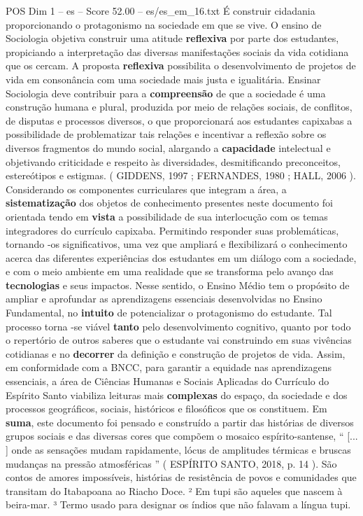 \begin{textsample}{POS Dim 1 – es – Score 52.00 – es/es\_em\_16.txt}
É construir cidadania proporcionando o protagonismo na sociedade em que se vive.
O ensino de Sociologia objetiva construir uma atitude \textbf{reflexiva} por parte dos estudantes, propiciando a interpretação das diversas manifestações sociais da vida cotidiana que os cercam.
A proposta \textbf{reflexiva} possibilita o desenvolvimento de projetos de vida em consonância com uma sociedade mais justa e igualitária.
Ensinar Sociologia deve contribuir para a \textbf{compreensão} de que a sociedade é uma construção humana e plural, produzida por meio de relações sociais, de conflitos, de disputas e processos diversos, o que proporcionará aos estudantes capixabas a possibilidade de problematizar tais relações e incentivar a reflexão sobre os diversos fragmentos do mundo social, alargando a \textbf{capacidade} intelectual e objetivando criticidade e respeito às diversidades, desmitificando preconceitos, estereótipos e estigmas. ( GIDDENS, 1997 ; FERNANDES, 1980 ; HALL, 2006 ).
Considerando os componentes curriculares que integram a área, a \textbf{sistematização} dos objetos de conhecimento presentes neste documento foi orientada tendo em \textbf{vista} a possibilidade de sua interlocução com os temas integradores do currículo capixaba.
Permitindo responder suas problemáticas, tornando -os significativos, uma vez que ampliará e flexibilizará o conhecimento acerca das diferentes experiências dos estudantes em um diálogo com a sociedade, e com o meio ambiente em uma realidade que se transforma pelo avanço das \textbf{tecnologias} e seus impactos.
Nesse sentido, o Ensino Médio tem o propósito de ampliar e aprofundar as aprendizagens essenciais desenvolvidas no Ensino Fundamental, no \textbf{intuito} de potencializar o protagonismo do estudante.
Tal processo torna -se viável \textbf{tanto} pelo desenvolvimento cognitivo, quanto por todo o repertório de outros saberes que o estudante vai construindo em suas vivências cotidianas e no \textbf{decorrer} da definição e construção de projetos de vida.
Assim, em conformidade com a BNCC, para garantir a equidade nas aprendizagens essenciais, a área de Ciências Humanas e Sociais Aplicadas do Currículo do Espírito Santo viabiliza leituras mais \textbf{complexas} do espaço, da sociedade e dos processos geográficos, sociais, históricos e filosóficos que os constituem.
Em \textbf{suma}, este documento foi pensado e construído a partir das histórias de diversos grupos sociais e das diversas cores que compõem o mosaico espírito-santense, “ [... ] onde as sensações mudam rapidamente, lócus de amplitudes térmicas e bruscas mudanças na pressão atmosféricas ” ( ESPÍRITO SANTO, 2018, p. 14 ).
São contos de amores impossíveis, histórias de resistência de povos e comunidades que transitam do Itabapoana ao Riacho Doce. ² Em tupi são aqueles que nascem à beira-mar. ³ Termo usado para designar os índios que não falavam a língua tupi.


\end{textsample}
